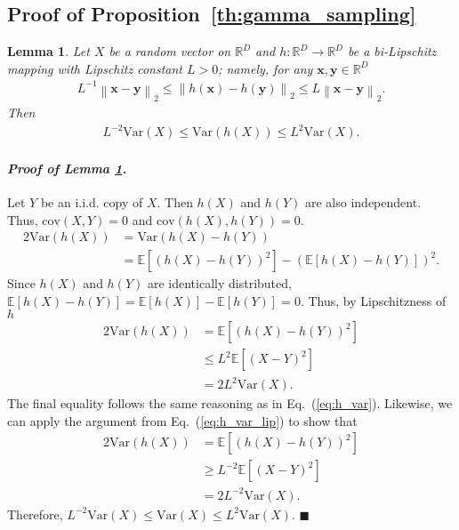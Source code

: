 \documentclass{article} \usepackage{iclr2024_coNFErence,times}
\def\eqref#1{equation~\ref{#1}}
\newcommand{\norm}[1]{\left\lVert#1\right\rVert}
\newenvironment{myproof}[2]{\paragraph{\textit{Proof of {#1} {#2}. }}}{\hfill$\blacksquare$}
\def\eqref#1{(\ref{#1})}
\def\eqref#1{(\ref{#1})}
\newtheorem{lemma}[theorem]{Lemma}
\theoremstyle{definition}
\theoremstyle{remark}
\begin{document}
\subsection{Proof of Proposition~\ref{th:gamma_sampling}}




\begin{lemma}\label{th:Lip_var}
    Let $X$ be a random vector on $\mathbb{R}^D$ and $h\colon\mathbb{R}^D\rightarrow\mathbb{R}^D$ be a bi-Lipschitz mapping with Lipschitz constant $L>0$; namely, for any $\mathbf{x}, \mathbf{y}\in\mathbb{R}^D$
    \begin{align*}
        L^{-1}\norm{\mathbf{x}-\mathbf{y}}_2 \leq \norm{h(\mathbf{x})-h(\mathbf{y})}_2\leq L \norm{\mathbf{x}-\mathbf{y}}_2.
    \end{align*}
    Then 
    \begin{align*}
         L^{-2}\text{Var}(X)\leq\text{Var}(h(X))\leq L^2\text{Var}(X).
    \end{align*}
\end{lemma}

\begin{myproof}{Lemma}{\ref{th:Lip_var}}
    Let $Y$ be an i.i.d. copy of $X$. Then $h(X)$ and $h(Y)$ are also independent. Thus, $\text{cov}(X,Y)=0$ and $\text{cov}(h(X),h(Y))=0$.
    \begin{align}\label{eq:h_var}
        2\text{Var}\left(h(X)\right) 
        &=  \text{Var}\left(h(X)-h(Y)\right) \nonumber
        \\&=\mathbb{E}\left[\left(h(X)-h(Y)\right)^2 \right] - \left(\mathbb{E}\left[h(X)-h(Y) \right]\right)^2.
    \end{align}
    Since $h(X)$ and $h(Y)$ are identically distributed, $\mathbb{E}\left[h(X)-h(Y) \right]=\mathbb{E}\left[h(X)\right]-\mathbb{E}\left[h(Y)\right]=0$.
    Thus, by Lipschitzness of $h$
    \begin{align}\label{eq:h_var_lip}
        2\text{Var}\left(h(X)\right) 
        &=\mathbb{E}\left[\left(h(X)-h(Y)\right)^2 \right] 
        \\&\leq L^2 \mathbb{E}\left[\left(X-Y\right)^2 \right] \nonumber
        \\&= 2 L^2 \text{Var}\left(X\right). \nonumber
    \end{align}    
    The final equality follows the same reasoning as in Eq.~\eqref{eq:h_var}. Likewise, we can apply the argument from Eq.~\eqref{eq:h_var_lip} to show that
    \begin{align*}
        2\text{Var}\left(h(X)\right) 
        &=\mathbb{E}\left[\left(h(X)-h(Y)\right)^2 \right] 
       \\ &\geq L^{-2} \mathbb{E}\left[\left(X-Y\right)^2 \right] 
        \\&= 2 L^{-2} \text{Var}\left(X\right). \nonumber
    \end{align*}
    Therefore, $L^{-2} \text{Var}\left(X\right) \leq \text{Var}\left(X\right) \leq L^2 \text{Var}\left(X\right)$.
\end{myproof}
\end{document}
